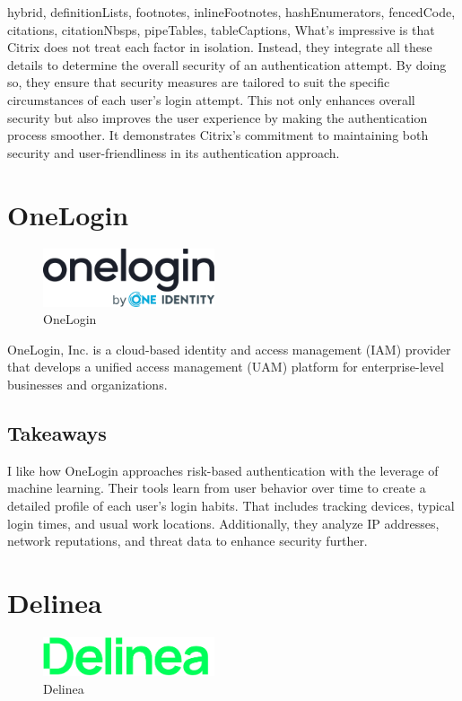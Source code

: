 \documentclass[
  digital,     %
  oneside,     %
  nosansbold,  %
  nocolorbold, %
  lof,         %
  lot,         %
]{fithesis4}
\begin{document}
\begin{markdown*}{%
  hybrid,
  definitionLists,
  footnotes,
  inlineFootnotes,
  hashEnumerators,
  fencedCode,
  citations,
  citationNbsps,
  pipeTables,
  tableCaptions,
}
What's impressive is that Citrix does not treat each factor in isolation.
Instead, they integrate all these details to determine the overall security of an authentication attempt.
By doing so, they ensure that security measures are tailored to suit the specific circumstances of each user's login attempt. This not only enhances overall security but also improves the user experience by making the authentication process smoother.
It demonstrates Citrix's commitment to maintaining both security and user-friendliness in its authentication approach.\cite{existing-citrix-wiki} \cite{existing-citrix-blog}


\newpage
\section{OneLogin}

\begin{figure}[htbp]
  \centering
  \includegraphics[width=0.45\textwidth]{img/onelogin.png}
  \caption{OneLogin}
  \label{fig:onelogin-logo}
\end{figure}

OneLogin, Inc. is a cloud-based identity and access management (IAM) provider that develops a unified access management (UAM) platform for enterprise-level businesses and organizations. \cite{existing-onelogin}

\subsection{Takeaways}
I like how OneLogin approaches risk-based authentication with the leverage of machine learning. 
Their tools learn from user behavior over time to create a detailed profile of each user's login habits.
That includes tracking devices, typical login times, and usual work locations.
Additionally, they analyze IP addresses, network reputations, and threat data to enhance security further.

\section{Delinea}

\begin{figure}[htbp]
  \centering
  \includegraphics[width=0.45\textwidth]{img/delinea.png}
  \caption{Delinea}
  \label{fig:delinea-logo}
\end{figure}


\end{markdown*}
\end{document}
